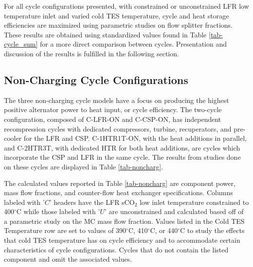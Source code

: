 \begin{paracol}{2}
For all cycle configurations presented, with constrained or unconstrained LFR low temperature inlet and varied cold TES temperature, cycle and heat storage efficiencies are maximized using parametric studies on flow splitter fractions. These results are obtained using standardized values found in Table \ref{tab-cycle_sum} for a more direct comparison between cycles. Presentation and discussion of the results is fulfilled in the following section. 

\subsection{Non-Charging Cycle Configurations}

The three non-charging cycle models have a focus on producing the highest positive alternator power to heat input, or cycle efficiency. The two-cycle configuration, composed of C-LFR-ON and C-CSP-ON, has independent recompression cycles with dedicated compressors, turbine, recuperators, and pre-cooler for the LFR and CSP. C-1HTR1T-ON, with the heat additions in parallel, and C-2HTR3T, with dedicated HTR for both heat additions, are cycles which incorporate the CSP and LFR in the same cycle. The results from studies done on these cycles are displayed in Table \ref{tab-noncharg}. 

The calculated values reported in Table \ref{tab-noncharg} are component power, mass flow fractions, and counter-flow heat exchanger specifications. Columns labeled with '$C$' headers have the LFR sCO$_2$ low inlet temperature constrained to 400$^{\circ}$C while those labeled with '$U$' are unconstrained and calculated based off of a parametric study on the MC mass flow fraction. Values listed in the Cold TES Temperature row are set to values of 390$^{\circ}$C, 410$^{\circ}$C, or 440$^{\circ}$C to study the effects that cold TES temperature has on cycle efficiency and to accommodate certain characteristics of cycle configurations. Cycles that do not contain the listed component and omit the associated values. 
\clearpage 
\end{paracol}
